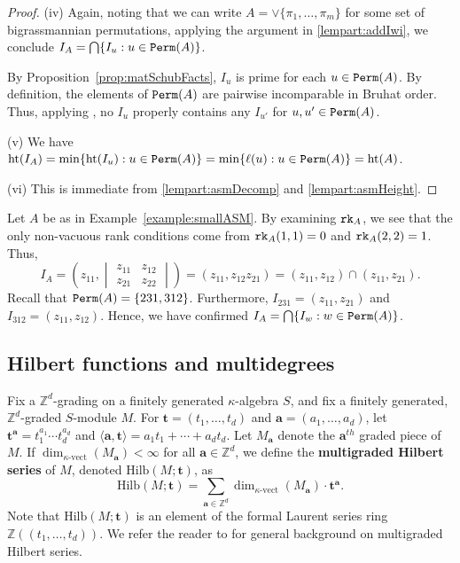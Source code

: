 \documentclass[12pt,reqno]{amsart}
\newtheorem{Main Conjecture}[theorem]{Main Conjecture}
\theoremstyle{remark}
\newenvironment{example}
  {\pushQED{\qed}\renewcommand{\qedsymbol}{$\diamondsuit$}\examplex}
  {\popQED\endexamplex}
\theoremstyle{plain}
\newcommand{\mydef}[1]{{\bf #1}}
\newcommand{\hgt}{{\rm{ht }}}
\newcommand{\perm}{{\tt Perm}}
\newcommand{\ZZ}{\mathbb{Z}}
\newcommand{\hilb}{\mbox{Hilb}}
\newcommand{\rk}{{\tt rk}}
\begin{document}
\begin{proof}
\noindent (iv) Again, noting that we can write $A= \vee \{\pi_1,\ldots,\pi_m\}$ for some set of bigrassmannian permutations, applying the argument in \ref{lempart:addIwi}, we conclude 
$ I_A= \bigcap\{ I_u:u\in \perm(A)\}$.

By Proposition~\ref{prop:matSchubFacts}, $I_u$ is prime for each $u\in \perm(A)$.  By definition, the elements of $\perm(A)$ are pairwise incomparable in Bruhat order.  Thus, applying \cite[Lemma~15.19]{MS04}, no $I_u$ properly contains any $I_{u'}$ for $u,u' \in \perm(A)$.  

\noindent (v)  We have $\hgt (I_A)=\min\{\hgt (I_u):u\in \perm(A)\}=\min\{\ell(u):u\in \perm(A)\}=\hgt(A)$.

\noindent (vi) This is immediate from \ref{lempart:asmDecomp} and \ref{lempart:asmHeight}.
\end{proof}


\begin{example}
Let $A$ be as in Example~\ref{example:smallASM}.  By examining $\rk_A$, we see that the only non-vacuous rank conditions come from $\rk_A(1,1)=0$ and $\rk_A(2,2)=1$.  Thus, \[I_A=\left(z_{11},\begin{vmatrix}z_{11}&z_{12}\\z_{21}&z_{22} \end{vmatrix}\right)=(z_{11}, z_{12}z_{21}) = (z_{11},z_{12})\cap(z_{11},z_{21}).\]
Recall that $\perm(A)=\{231,312\}$.  Furthermore, $I_{231}=(z_{11},z_{21})$ and $I_{312}=(z_{11},z_{12})$.  Hence, we have confirmed $I_A=\bigcap \{I_w : w\in \perm(A)\}$.
\end{example}

\subsection{Hilbert functions and multidegrees}
\label{subsect:hilb}
Fix a $\ZZ^d$-grading on a finitely generated $\kappa$-algebra $S$, and fix a finitely generated, $\ZZ^d$-graded $S$-module $M$.  
For $\mathbf{t} = (t_1, \ldots, t_d)$ and $\mathbf{a} = (a_1, \ldots, a_d)$, let $\mathbf{t}^\mathbf{a} = t_1^{a_1}\cdots t_d^{a_d}$ and $\langle\mathbf a,\mathbf t \rangle=a_1t_1+\cdots+a_dt_d$.  
Let $M_\mathbf{a}$ denote the $\mathbf{a}^{th}$ graded piece of $M$.  If $\dim_{\kappa\text{-vect}}(M_\mathbf{a})<\infty$
for all $\mathbf{a} \in \ZZ^d$, we define the \mydef{multigraded Hilbert series} of $M$, denoted $\hilb(M;\mathbf t)$, as \[
\hilb(M;\mathbf t) = \sum_{\mathbf{a} \in \ZZ^d}\dim_{\kappa\text{-vect}}(M_\mathbf{a}) \cdot \mathbf{t}^\mathbf{a}.
\]  
 Note that $\hilb(M;\mathbf t)$ is an element of the formal Laurent series ring $\ZZ((t_1, \ldots, t_d))$.  We refer the reader to \cite[Chapter 8]{MS04} for general background on multigraded Hilbert series.
\end{document}
